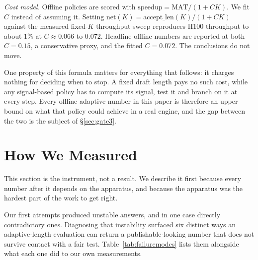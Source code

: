 \documentclass[conference]{IEEEtran}
\begin{document}
\emph{Cost model.} Offline policies are scored with $\mathrm{speedup} = \mathrm{MAT}/(1+CK)$.
We fit $C$ instead of assuming it. Setting $\mathrm{net}(K) = \mathrm{accept\_len}(K)/(1+CK)$
against the measured fixed-$K$ throughput sweep reproduces H100 throughput to about $1\%$ at
$C \approx 0.066$ to $0.072$. Headline offline numbers are reported at both $C{=}0.15$, a
conservative proxy, and the fitted $C{=}0.072$. The conclusions do not move.

One property of this formula matters for everything that follows: it charges nothing for
deciding when to stop. A fixed draft length pays no such cost, while any signal-based policy
has to compute its signal, test it and branch on it at every step. Every offline adaptive
number in this paper is therefore an upper bound on what that policy could achieve in a real
engine, and the gap between the two is the subject of \S\ref{sec:gate3}.

\section{How We Measured}
\label{sec:protocol}
This section is the instrument, not a result. We describe it first because every number after
it depends on the apparatus, and because the apparatus was the hardest part of the work to get right.

Our first attempts produced unstable answers, and in one case directly contradictory ones.
Diagnosing that instability surfaced six distinct ways an adaptive-length evaluation can return a
publishable-looking number that does not survive contact with a fair test.
Table~\ref{tab:failuremodes} lists them alongside what each one did to our own measurements.
\end{document}
